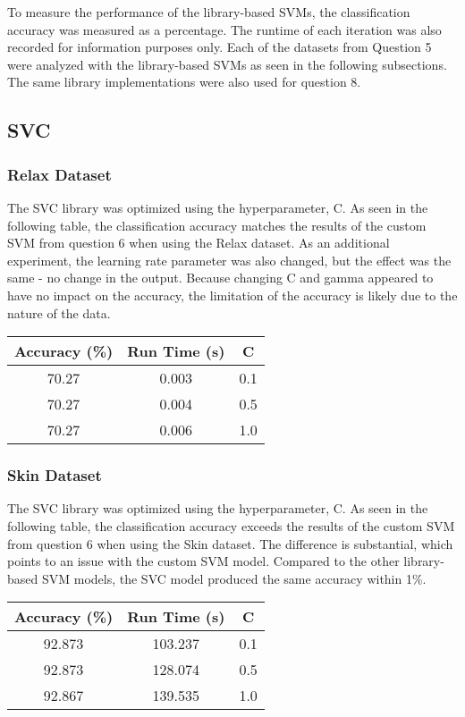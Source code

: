 \documentclass[letterpaper]{article}
\begin{document}
To measure the performance of the library-based SVMs, the classification accuracy was measured as a percentage. The runtime of each iteration was also recorded for information purposes only. Each of the datasets from Question 5 were analyzed with the library-based SVMs as seen in the following subsections. The same library implementations were also used for question 8.

\subsection{SVC}
\subsubsection{Relax Dataset}
The SVC library was optimized using the hyperparameter, C. As seen in the following table, the classification accuracy matches the results of the custom SVM from question 6 when using the Relax dataset. As an additional experiment, the learning rate parameter was also changed, but the effect was the same - no change in the output. Because changing C and gamma appeared to have no impact on the accuracy, the limitation of the accuracy is likely due to the nature of the data.

\begin{center}
\begin{tabular}{|c c c|} 
 \hline
 Accuracy (\%) & Run Time (s) & C \\
 \hline
 70.27 & 0.003	& 0.1 \\
 \hline
 70.27 & 0.004	& 0.5 \\
 \hline
 70.27 & 0.006	& 1.0 \\
 \hline
\end{tabular}
\end{center}

\subsubsection{Skin Dataset}
The SVC library was optimized using the hyperparameter, C. As seen in the following table, the classification accuracy exceeds the results of the custom SVM from question 6 when using the Skin dataset. The difference is substantial, which points to an issue with the custom SVM model. Compared to the other library-based SVM models, the SVC model produced the same accuracy within 1\%. 

\begin{center}
\begin{tabular}{|c c c|} 
 \hline
 Accuracy (\%) & Run Time (s) & C \\
 \hline
 92.873 & 103.237 & 0.1 \\
 \hline
 92.873 & 128.074 & 0.5 \\
 \hline
 92.867 & 139.535 & 1.0 \\
 \hline
\end{tabular}
\end{center}
\end{document}
